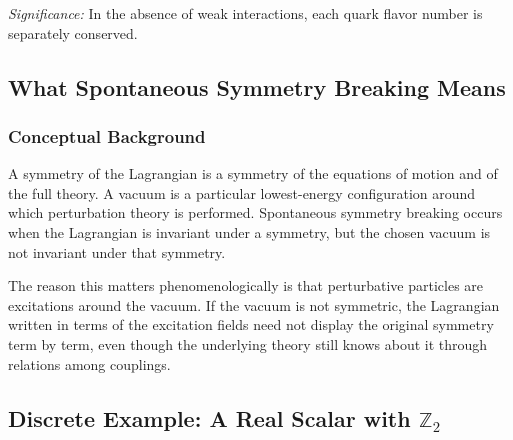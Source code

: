 \textit{Significance:} In the absence of weak interactions, each quark flavor number is separately conserved.

\subsection{What Spontaneous Symmetry Breaking Means}\label{subsec:lec15:ssb-meaning}

\subsubsection*{Conceptual Background}

A symmetry of the Lagrangian is a symmetry of the equations of motion and of the full theory. A vacuum is a particular lowest-energy configuration around which perturbation theory is performed. Spontaneous symmetry breaking occurs when the Lagrangian is invariant under a symmetry, but the chosen vacuum is not invariant under that symmetry.


The reason this matters phenomenologically is that perturbative particles are excitations around the vacuum. If the vacuum is not symmetric, the Lagrangian written in terms of the excitation fields need not display the original symmetry term by term, even though the underlying theory still knows about it through relations among couplings.


\subsection{\texorpdfstring{Discrete Example: A Real Scalar with $\mathbb Z_2$}{Discrete Example: A Real Scalar with Z2}}\label{subsec:lec15:z2-real-scalar}

